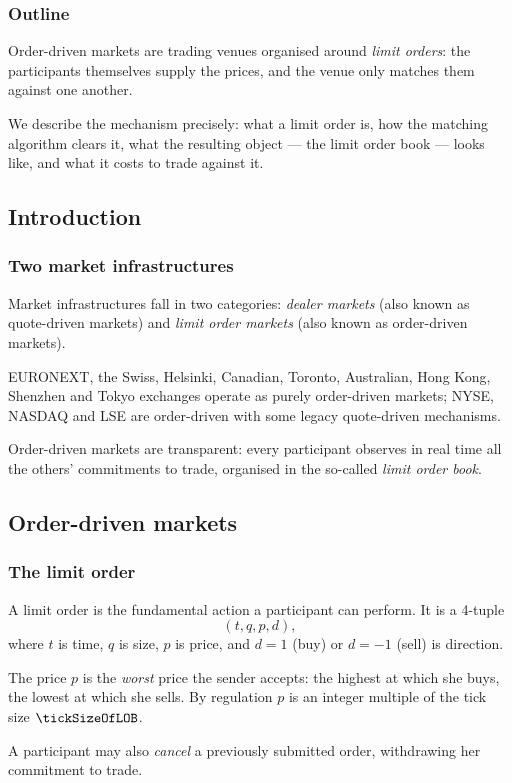 \begin{frame}
  \frametitle{Outline}
\nocite{FPR13mar}
\nocite{GPWMFH13lim}
\nocite{CDJ18enh}
Order-driven markets are trading venues organised around \emph{limit orders}:
the participants themselves supply the prices,
and the venue only matches them against one another.

We describe the mechanism precisely:
what a limit order is,
how the matching algorithm clears it,
what the resulting object --- the limit order book --- looks like,
and what it costs to trade against it.
\end{frame}

\subsection{Introduction}

\begin{frame}
  \frametitle{Two market infrastructures}
Market infrastructures fall in two categories:
\emph{dealer markets} (also known as quote-driven markets)
and
\emph{limit order markets} (also known as order-driven markets).

EURONEXT, the Swiss, Helsinki, Canadian, Toronto, Australian, Hong Kong, Shenzhen and Tokyo
exchanges operate as purely order-driven markets;
NYSE, NASDAQ and LSE are order-driven with some legacy quote-driven mechanisms.

Order-driven markets are transparent:
every participant observes in real time all the others' commitments to trade,
organised in the so-called \emph{limit order book}.
\end{frame}

\subsection{Order-driven markets}

\begin{frame}
  \frametitle{The limit order}
A limit order is the fundamental action a participant can perform.
It is a 4-tuple
\[
(t,q,p,d),
\]
where $t$ is time, $q$ is size, $p$ is price,
and $d=1$ (buy) or $d=-1$ (sell) is direction.

The price $p$ is the \emph{worst} price the sender accepts:
the highest at which she buys, the lowest at which she sells.
By regulation $p$ is an integer multiple of the tick size $\tickSizeOfLOB$.

A participant may also \emph{cancel} a previously submitted order,
withdrawing her commitment to trade.
\end{frame}

